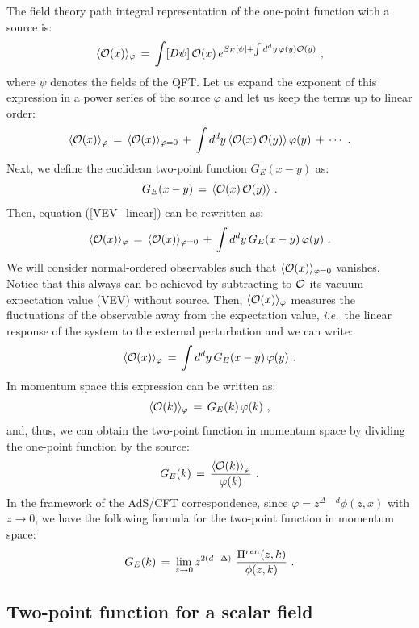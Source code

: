 \documentclass[12pt,notitlepage]{article}
\newcommand{\beq}{\begin{equation}}
\newcommand{\eeq}{\end{equation}}
\def\ie{{\emph{i.e.}}}
\begin{document}
The field theory path integral representation of the one-point function with  a source is:
\beq
\langle {\cal O}(x)\rangle_{\varphi}\,=\,
\int [D\psi]\,  {\cal O}(x)\, e^{S_E[\psi]+\int d^dy \,\varphi(y) {\cal O}(y) }\,\,,
\eeq
where $\psi$ denotes the fields of the QFT. Let us expand the exponent of this expression in a power series of the source $\varphi$ and let us keep the terms up to linear order:
\beq
\langle {\cal O}(x)\rangle_{\varphi}\,=\,\langle {\cal O}(x)\rangle_{\varphi=0}\,+\,
\int d^dy\,\langle {\cal O}(x)\, {\cal O}(y)\rangle\, \varphi(y)\,+\,\cdots\,\,.
\label{VEV_linear}
\eeq
Next, we define the euclidean two-point function $G_E(x-y)$ as:
\beq
G_E(x-y)\,=\,\langle {\cal O}(x)\, {\cal O}(y)\rangle\,\,.
\eeq
Then,  equation (\ref{VEV_linear}) can be rewritten as:
\beq
\langle {\cal O}(x)\rangle_{\varphi}\,=\,\langle {\cal O}(x)\rangle_{\varphi=0}\,+\,
\int d^dy\,G_E(x-y)\, \varphi(y)\,\,.
\eeq
We will consider normal-ordered observables such that 
$\langle {\cal O}(x)\rangle_{\varphi=0}$ vanishes. Notice that this always can be achieved by subtracting to ${\cal O}$  its  vacuum expectation value (VEV)  without source. Then, $\langle {\cal O}(x)\rangle_{\varphi}$ measures the fluctuations of the observable away from the expectation value, \ie\ the linear response of the system to the external perturbation and we can write:
\beq
\langle {\cal O}(x)\rangle_{\varphi}\,=\,\int d^dy\,G_E(x-y)\, \varphi(y)\,\,.
\eeq
In momentum space this expression can be written as:
\beq
\langle {\cal O}( k)\rangle_{\varphi}\,=\,
G_E( k)\,\varphi(k)\,\,,
\eeq
and, thus, we can obtain the two-point function in momentum space by dividing the one-point function by the source:
\beq
G_E(k)\,=\,{\langle {\cal O}( k)\rangle_{\varphi}
\over \varphi(k)}\,\,.
\label{G_E_varphi}
\eeq
In  the framework of the AdS/CFT correspondence,  since $\varphi=z^{\Delta-d} \phi(z,x)$ with $z\to 0$, we have the following formula for the two-point function in momentum  space:
\beq
G_E( k)\,=\,\lim_{z\to 0} z^{2(d-\Delta)}\,\,
{\Pi^{ren}(z, k)\over \phi(z, k)}\,\,.
\eeq

\subsection{Two-point function for a scalar field}
\end{document}
